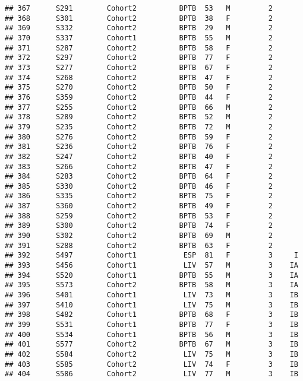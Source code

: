 \documentclass[
]{article}
\begin{document}
\begin{verbatim}
## 367      S291        Cohort2          BPTB  53   M         2      
## 368      S301        Cohort2          BPTB  38   F         2      
## 369      S332        Cohort2          BPTB  29   M         2      
## 370      S337        Cohort1          BPTB  55   M         2      
## 371      S287        Cohort2          BPTB  58   F         2      
## 372      S297        Cohort2          BPTB  77   F         2      
## 373      S277        Cohort2          BPTB  67   F         2      
## 374      S268        Cohort2          BPTB  47   F         2      
## 375      S270        Cohort2          BPTB  50   F         2      
## 376      S359        Cohort2          BPTB  44   F         2      
## 377      S255        Cohort2          BPTB  66   M         2      
## 378      S289        Cohort2          BPTB  52   M         2      
## 379      S235        Cohort2          BPTB  72   M         2      
## 380      S276        Cohort2          BPTB  59   F         2      
## 381      S236        Cohort2          BPTB  76   F         2      
## 382      S247        Cohort2          BPTB  40   F         2      
## 383      S266        Cohort2          BPTB  47   F         2      
## 384      S283        Cohort2          BPTB  64   F         2      
## 385      S330        Cohort2          BPTB  46   F         2      
## 386      S335        Cohort2          BPTB  75   F         2      
## 387      S360        Cohort2          BPTB  49   F         2      
## 388      S259        Cohort2          BPTB  53   F         2      
## 389      S300        Cohort2          BPTB  74   F         2      
## 390      S302        Cohort2          BPTB  69   M         2      
## 391      S288        Cohort2          BPTB  63   F         2      
## 392      S497        Cohort1           ESP  81   F         3     I
## 393      S456        Cohort1           LIV  57   M         3    IA
## 394      S520        Cohort1          BPTB  55   M         3    IA
## 395      S573        Cohort2          BPTB  58   M         3    IA
## 396      S401        Cohort1           LIV  73   M         3    IB
## 397      S410        Cohort1           LIV  75   M         3    IB
## 398      S482        Cohort1          BPTB  68   F         3    IB
## 399      S531        Cohort1          BPTB  77   F         3    IB
## 400      S534        Cohort1          BPTB  56   M         3    IB
## 401      S577        Cohort2          BPTB  67   M         3    IB
## 402      S584        Cohort2           LIV  75   M         3    IB
## 403      S585        Cohort2           LIV  74   F         3    IB
## 404      S586        Cohort2           LIV  77   M         3    IB

\end{verbatim}
\end{document}
